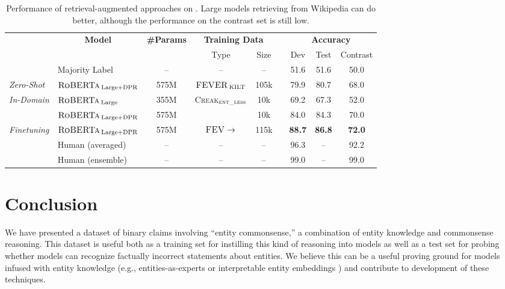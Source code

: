 \renewcommand{\arraystretch}{1}
\begin{table*}[t]
	\centering
	\small
		\caption{Performance of retrieval-augmented approaches on \oursno. Large models retrieving from Wikipedia can do better, although the performance on the contrast set is still low.}
	\setlength{\tabcolsep}{4pt}
    \centering
	\begin{tabular}{ll c c c c c c c}
		\toprule
		&\multicolumn{1}{c}{\multirow{2}{*}{\textbf{Model}}}  & \multicolumn{1}{c}{\multirow{2}{*}{\textbf{\#Params}}} & \multicolumn{2}{c}{\textbf{Training Data}} &&  \multicolumn{3}{c}{\multirow{1}{*}{\textbf{Accuracy}}}\\
		&& \multicolumn{1}{c}{} & \multicolumn{1}{c}{Type} &  \multicolumn{1}{c}{Size} && \multicolumn{1}{c}{Dev}  & \multicolumn{1}{c}{Test} & \multicolumn{1}{c}{Contrast}\\
		\midrule
		&Majority Label & -- & -- & -- && 51.6 & 51.6  & 50.0 \\ 
		\midrule
		\textit{Zero-Shot}&$\textsc{RoBERTa}_{\:\text{Large+DPR}}$ & 575M & $\textsc{FEVER}_{\:\text{KILT}}$ & 105k && 79.9 & 80.7 & 68.0  \\
		\midrule
		\multirow{2}{*}{\textit{In-Domain}} & $\textsc{RoBERTa}_{\:\text{Large}}$ & 355M & \textsc{Creak}$_\textsc{ent\_less}$ & 10k && 69.2 & 67.3 & 52.0 \\
		&$\textsc{RoBERTa}_{\:\text{Large+DPR}}$ & 575M & \textsc{\ours} & 10k && 84.0 & 84.3 & 70.0 \\
		\midrule
		\textit{Finetuning}&$\textsc{RoBERTa}_{\:\text{Large+DPR}}$ & 575M & $\textsc{FEV} \rightarrow$ \textsc{\ours} & 115k && \textbf{88.7} & \textbf{86.8} & \textbf{72.0} \\
		\midrule
		&Human (averaged)  & -- & -- & -- && 96.3 & --  & 92.2 \\  
		&Human (ensemble)  & -- & -- & -- && 99.0 & --  & 99.0 \\  
		\bottomrule 
	\end{tabular} \label{tab:open-book}
	\vspace{-4pt}
\end{table*}

\section{Conclusion}

We have presented a dataset \ours of binary claims involving ``entity commonsense,'' a combination of entity knowledge and commonsense reasoning. This dataset is useful both as a training set for instilling this kind of reasoning into models as well as a test set for probing whether models can recognize factually incorrect statements about entities. 
We believe this can be a useful proving ground for models infused with entity knowledge (e.g., entities-as-experts \citep{fevry-etal-2020-entities} or interpretable entity embeddings \citep{onoe-durrett-2020-interpretable}) and contribute to development of these techniques.

